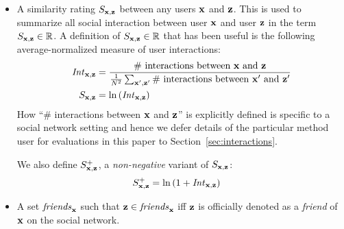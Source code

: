 \begin{itemize}
\item A similarity rating $S_{\mathbf{x},\mathbf{z}}$ between any users $\mathbf{x}$ and $\mathbf{z}$. This is used to summarize all social
interaction between user $\mathbf{x}$ and user $\mathbf{z}$ in the term $S_{\mathbf{x},\mathbf{z}} \in
\mathbb{R}$.  A definition of $S_{\mathbf{x},\mathbf{z}} \in \mathbb{R}$ that has been useful is the
following average-normalized measure of user interactions:
\begin{align}
\mathit{Int}_{\mathbf{x},\mathbf{z}} & = \frac{\mbox{\# interactions between $\mathbf{x}$
and $\mathbf{z}$}}{\frac{1}{N^2} \sum_{\mathbf{x}',\mathbf{z}'} \mbox{\# interactions between $\mathbf{x}'$
and $\mathbf{z}'$}} \nonumber \\
S_{\mathbf{x},\mathbf{z}} & = \ln \left( \mathit{Int}_{\mathbf{x},\mathbf{z}} \right)
\end{align}
How ``\# interactions between $\mathbf{x}$ and $\mathbf{z}$'' is explicitly defined is
specific to a social network setting and hence we defer details of the
particular method user for evaluations in this paper to
Section~\ref{sec:interactions}.

We also define $S^+_{\mathbf{x},\mathbf{z}}$, a \emph{non-negative} 
variant of $S_{\mathbf{x},\mathbf{z}}$:
\begin{align}
S^+_{\mathbf{x},\mathbf{z}} & = \ln \left( 1 + \mathit{Int}_{\mathbf{x},\mathbf{z}} \right)
\end{align}
\item A set $\mathit{friends}_{\mathbf{x}}$ such that $\mathbf{z} \in \mathit{friends}_{\mathbf{x}}$
iff $\mathbf{z}$ is officially denoted as a \emph{friend} of $\mathbf{x}$ 
on the social network.
\end{itemize}

%

